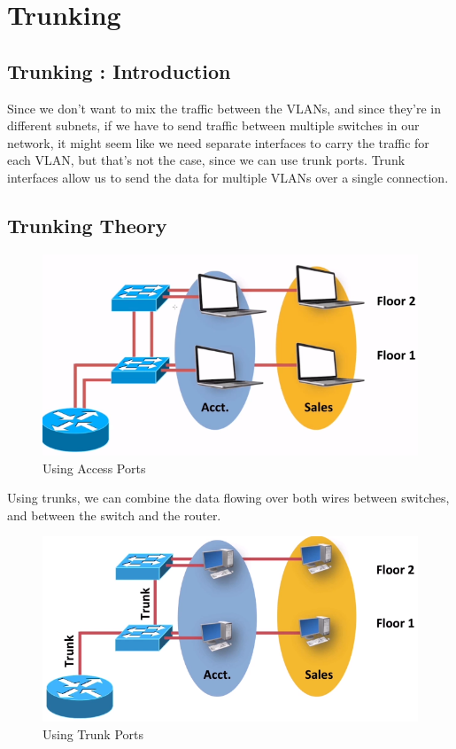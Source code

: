 \chapter{Trunking}

\section{Trunking : Introduction}
Since we don't want to mix the traffic between the VLANs, and since they're in different subnets, if we have to send traffic between multiple switches in our network, it might seem like we need separate interfaces to carry the traffic for each VLAN, but that's not the case, since we can use trunk ports. Trunk interfaces allow us to send the data for multiple VLANs over a single connection. 

\section{Trunking Theory}
\begin{figure}[H]
	\centering
	\includegraphics[width=0.7\linewidth]{"ICND1/1. Switches/chapters/2.2.b With VLANs"}
	\caption{Using Access Ports}
\end{figure}

\noindent
Using trunks, we can combine the data flowing over both wires between switches, and between the switch and the router. 

\begin{figure}[H]
	\centering
	\includegraphics[width=0.7\linewidth]{"ICND1/1. Switches/chapters/3.2.a Trunking"}
	\caption{Using Trunk Ports}
	\label{fig:3.2.a}
\end{figure}


